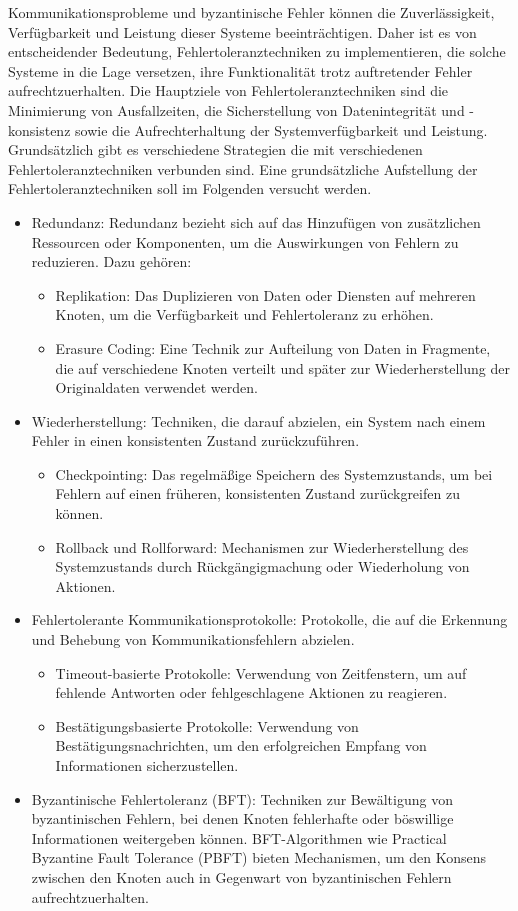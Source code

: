 \documentclass[../vs-script-first-v01.tex]{subfiles}
\begin{document}
Kommunikationsprobleme und byzantinische Fehler können die Zuverlässigkeit, Verfügbarkeit und Leistung dieser Systeme beeinträchtigen. Daher ist es von entscheidender Bedeutung, Fehlertoleranztechniken zu implementieren, die solche Systeme in die Lage versetzen, ihre Funktionalität trotz auftretender Fehler aufrechtzuerhalten. Die Hauptziele von Fehlertoleranztechniken sind die Minimierung von Ausfallzeiten, die Sicherstellung von Datenintegrität und -konsistenz sowie die Aufrechterhaltung der Systemverfügbarkeit und Leistung. Grundsätzlich gibt es verschiedene Strategien die mit verschiedenen Fehlertoleranztechniken verbunden sind. Eine grundsätzliche Aufstellung der Fehlertoleranztechniken soll im Folgenden versucht werden. 

\begin{itemize}
\item Redundanz: Redundanz bezieht sich auf das Hinzufügen von zusätzlichen Ressourcen oder Komponenten, um die Auswirkungen von Fehlern zu reduzieren. Dazu gehören:
\begin{itemize}
\item Replikation: Das Duplizieren von Daten oder Diensten auf mehreren Knoten, um die Verfügbarkeit und Fehlertoleranz zu erhöhen.
\item Erasure Coding: Eine Technik zur Aufteilung von Daten in Fragmente, die auf verschiedene Knoten verteilt und später zur Wiederherstellung der Originaldaten verwendet werden.
\end{itemize}
\item Wiederherstellung: Techniken, die darauf abzielen, ein System nach einem Fehler in einen konsistenten Zustand zurückzuführen.
\begin{itemize}
\item Checkpointing: Das regelmäßige Speichern des Systemzustands, um bei Fehlern auf einen früheren, konsistenten Zustand zurückgreifen zu können.
\item Rollback und Rollforward: Mechanismen zur Wiederherstellung des Systemzustands durch Rückgängigmachung oder Wiederholung von Aktionen.
\end{itemize}
\item Fehlertolerante Kommunikationsprotokolle: Protokolle, die auf die Erkennung und Behebung von Kommunikationsfehlern abzielen.
\begin{itemize}
\item Timeout-basierte Protokolle: Verwendung von Zeitfenstern, um auf fehlende Antworten oder fehlgeschlagene Aktionen zu reagieren.
\item Bestätigungsbasierte Protokolle: Verwendung von Bestätigungsnachrichten, um den erfolgreichen Empfang von Informationen sicherzustellen.
\end{itemize}
\item Byzantinische Fehlertoleranz (BFT): Techniken zur Bewältigung von byzantinischen Fehlern, bei denen Knoten fehlerhafte oder böswillige Informationen weitergeben können. BFT-Algorithmen wie Practical Byzantine Fault Tolerance (PBFT) bieten Mechanismen, um den Konsens zwischen den Knoten auch in Gegenwart von byzantinischen Fehlern aufrechtzuerhalten.
\end{itemize}
\end{document}
